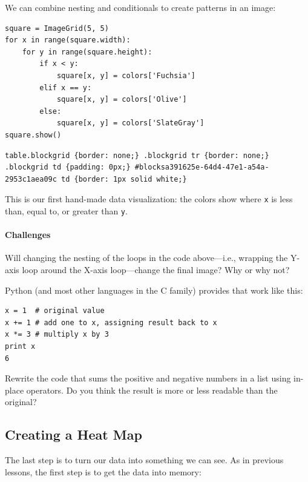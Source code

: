 \documentclass{book}
\begin{document}
We can combine nesting and conditionals to create patterns in an image:

\begin{verbatim}
square = ImageGrid(5, 5)
for x in range(square.width):
    for y in range(square.height):
        if x < y:
            square[x, y] = colors['Fuchsia']
        elif x == y:
            square[x, y] = colors['Olive']
        else:
            square[x, y] = colors['SlateGray']
square.show()
\end{verbatim}

\begin{verbatim}
table.blockgrid {border: none;} .blockgrid tr {border: none;} .blockgrid td {padding: 0px;} #blocksa391625e-64d4-47e1-a54a-2953c1aea09c td {border: 1px solid white;}
\end{verbatim}

This is our first hand-made data visualization: the colors show where
\texttt{x} is less than, equal to, or greater than \texttt{y}.

\mbox{}\paragraph{Challenges}

\begin{swcenumerate}
\item
  Will changing the nesting of the loops in the code above---i.e.,
  wrapping the Y-axis loop around the X-axis loop---change the final
  image? Why or why not?
\item
  Python (and most other languages in the C family) provides
   that work like
  this:

\begin{verbatim}
x = 1  # original value
x += 1 # add one to x, assigning result back to x
x *= 3 # multiply x by 3
print x
6
\end{verbatim}

  Rewrite the code that sums the positive and negative numbers in a list
  using in-place operators. Do you think the result is more or less
  readable than the original?
\end{swcenumerate}

\subsection{Creating a Heat Map}

The last step is to turn our data into something we can see. As in
previous lessons, the first step is to get the data into memory:
\end{document}
